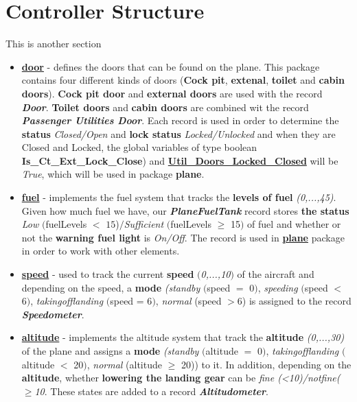 \documentclass{llncs}
\begin{document}
\section{Controller Structure}
This is another section
\begin{itemize}
\item \textbf{\underline{door}} - defines the doors that can be found on the plane. This package contains four different kinds of doors (\textcolor{BlueViridis}{\textbf{Cock pit}}, \textcolor{BlueViridis}{\textbf{extenal}}, \textcolor{BlueViridis}{\textbf{toilet}} and \textcolor{BlueViridis}{\textbf{cabin doors}}). \textcolor{BlueViridis}{\textbf{Cock pit door}} and \textcolor{BlueViridis}{\textbf{external doors}} are used with the record \textcolor{GreenViridis}{\textbf{\textit{Door}}}. \textcolor{BlueViridis}{\textbf{Toilet doors}} and \textcolor{BlueViridis}{\textbf{cabin doors}} are combined wit the record \textcolor{GreenViridis}{\textbf{\textit{Passenger Utilities Door}}}. Each record is used in order to determine the \textbf{status } \textit{Closed/Open} and \textbf{lock status} \textit{Locked/Unlocked} and when they are Closed and Locked, the global variables of type boolean \textcolor{PurpleViridis}{\textbf{{Is\_Ct\_Ext\_Lock\_Close}}}) and \textcolor{PurpleViridis}{\textbf{{\underline{Util\_Doors\_Locked\_Closed}}}} will be \textit{True}, which will be used in package \textbf{plane}.
\item \textbf{\underline{fuel}} - implements the fuel system that tracks the \textcolor{BlueViridis}{\textbf{levels of fuel}} \textit{(0,...,45)}. Given how much fuel we have, our \textcolor{GreenViridis}{\textbf{\textit{PlaneFuelTank}}} record stores \textcolor{BlueViridis}{\textbf{the status}}  \textit{Low} $($fuelLevels $<$ $15$)$/$\textit{Sufficient} $($fuelLevels $\geqslant$ 15$)$ of fuel and whether or not the \textcolor{BlueViridis}{\textbf{warning fuel light}} is \textit{On/Off}. The record is used in \textbf{\underline{plane}} package in order to work with other elements.
\item \textbf{\underline{speed}} - used to track the current \textcolor{BlueViridis}{\textbf{speed}} \textit{$($0,...,10$)$} of the aircraft and depending on the speed, a \textcolor{BlueViridis}{\textbf{mode}} \textit{(standby} $($speed $=$ 0$)$, \textit{speeding} $($speed $<$ 6$)$, \textit{takingofflanding} $($speed = 6$)$, \textit{normal} (speed $>6$) is assigned to the record \textcolor{GreenViridis}{\textbf{\textit{Speedometer}}}.
\item \textbf{\underline{altitude}} - implements the altitude system that track the \textcolor{BlueViridis}{\textbf{altitude}} \textit{(0,...,30)} of the plane and assigns a \textcolor{BlueViridis}{\textbf{mode}} \textit{(standby} $($altitude $=$ 0$)$, \textit{takingofflanding} $($altitude $<$ 20$)$, \textit{normal} (altitude $\geqslant$ 20)) to it. In addition, depending on the \textcolor{BlueViridis}{\textbf{altitude}}, whether \textcolor{BlueViridis}{\textbf{lowering the landing gear}}  can be \textit{fine (<10)/notfine($\geqslant$10}. These states are added to a record \textcolor{GreenViridis}{\textbf{\textit{Altitudometer}}}.

\end{itemize}
\end{document}

